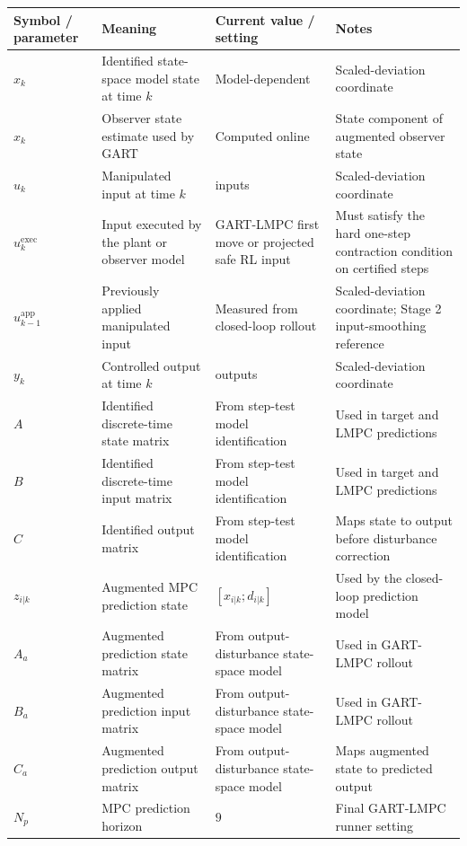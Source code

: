 \documentclass[11pt]{article}
\begin{document}
\begingroup
\scriptsize
\setlength{\tabcolsep}{2pt}
\begin{longtable}{>{\raggedright\arraybackslash}p{}>{\raggedright\arraybackslash}p{}>{\raggedright\arraybackslash}p{}>{\raggedright\arraybackslash}p{}}
\toprule
Symbol / parameter & Meaning & Current value / setting & Notes \\
\midrule
\endhead
$x_k$ & Identified state-space model state at time $k$ & Model-dependent & Scaled-deviation coordinate \\
$\hat x_k$ & Observer state estimate used by GART & Computed online & State component of augmented observer state \\
$u_k$ & Manipulated input at time $k$ & 2 inputs & Scaled-deviation coordinate \\
$u_k^{\mathrm{exec}}$ & Input executed by the plant or observer model & GART-LMPC first move or projected safe RL input & Must satisfy the hard one-step contraction condition on certified steps \\
$u_{k-1}^{\mathrm{app}}$ & Previously applied manipulated input & Measured from closed-loop rollout & Scaled-deviation coordinate; Stage 2 input-smoothing reference \\
$y_k$ & Controlled output at time $k$ & 2 outputs & Scaled-deviation coordinate \\
$A$ & Identified discrete-time state matrix & From step-test model identification & Used in target and LMPC predictions \\
$B$ & Identified discrete-time input matrix & From step-test model identification & Used in target and LMPC predictions \\
$C$ & Identified output matrix & From step-test model identification & Maps state to output before disturbance correction \\
$z_{i|k}$ & Augmented MPC prediction state & $[x_{i|k};d_{i|k}]$ & Used by the closed-loop prediction model \\
$A_a$ & Augmented prediction state matrix & From output-disturbance state-space model & Used in GART-LMPC rollout \\
$B_a$ & Augmented prediction input matrix & From output-disturbance state-space model & Used in GART-LMPC rollout \\
$C_a$ & Augmented prediction output matrix & From output-disturbance state-space model & Maps augmented state to predicted output \\
$N_p$ & MPC prediction horizon & $9$ & Final GART-LMPC runner setting \\

\end{longtable}
\end{document}
